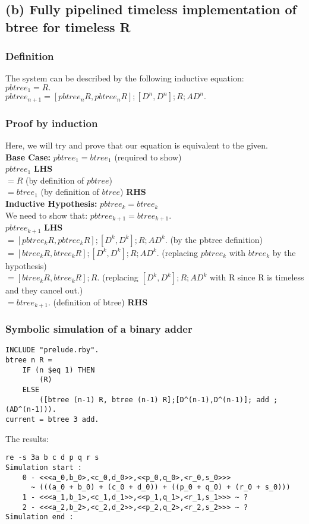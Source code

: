 \documentclass[a4paper,10pt]{article}
\begin{document}
\subsection*{(b) Fully pipelined timeless implementation of btree for timeless R}
\subsubsection*{Definition}
The system can be described by the following inductive equation: \\[0.25cm]
$pbtree_1 = R.$ \\[0.25cm]
$pbtree_{n+1} = [pbtree_n R,pbtree_n R];[D^n,D^n];R;AD^n.$
\subsubsection*{Proof by induction}
Here, we will try and prove that our equation is equivalent to the given.\\[0.5cm]
\textbf{Base Case:}  $pbtree_1 = btree_1$ (required to show)\\[0.25cm]
$pbtree_1$ \textbf{LHS} \\[0.25cm]
$=R$  (by definition of $pbtree$) \\[0.25cm]
$=btree_1 $ (by definition of $btree$) \textbf{RHS}
\\[0.5cm]
\textbf{Inductive Hypothesis:} $pbtree_k = btree_k $ \\[0.25cm]
We need to show that: $pbtree_{k+1} = btree_{k+1}.$ \\[0.25cm]
$pbtree_{k+1}$ \textbf{LHS} \\[0.25cm]
$=[pbtree_k R,pbtree_k R];[D^k,D^k];R;AD^k.$ (by the pbtree definition)\\[0.25cm]
$=[btree_k R,btree_k R];[D^k,D^k];R;AD^k.$ (replacing $pbtree_k$ with $btree_k$ by the hypothesis)\\[0.25cm]
$=[btree_k R,btree_k R];R.$ (replacing $[D^k,D^k];R;AD^k$ with R since R is timeless and they cancel out.)\\[0.25cm]
$=btree_{k+1}.$ (definition of btree) \textbf{RHS}
\subsubsection*{Symbolic simulation of a binary adder}
\begin{Verbatim}
INCLUDE "prelude.rby".
btree n R = 
	IF (n $eq 1) THEN
		(R) 
	ELSE 
		([btree (n-1) R, btree (n-1) R];[D^(n-1),D^(n-1)]; add ; (AD^(n-1))).
current = btree 3 add.
\end{Verbatim}
The results:
\begin{Verbatim}
re -s 3a b c d p q r s
Simulation start :
    0 - <<<a_0,b_0>,<c_0,d_0>>,<<p_0,q_0>,<r_0,s_0>>> 
	  ~ (((a_0 + b_0) + (c_0 + d_0)) + ((p_0 + q_0) + (r_0 + s_0)))
    1 - <<<a_1,b_1>,<c_1,d_1>>,<<p_1,q_1>,<r_1,s_1>>> ~ ?
    2 - <<<a_2,b_2>,<c_2,d_2>>,<<p_2,q_2>,<r_2,s_2>>> ~ ?
Simulation end :
\end{Verbatim}
\end{document}
